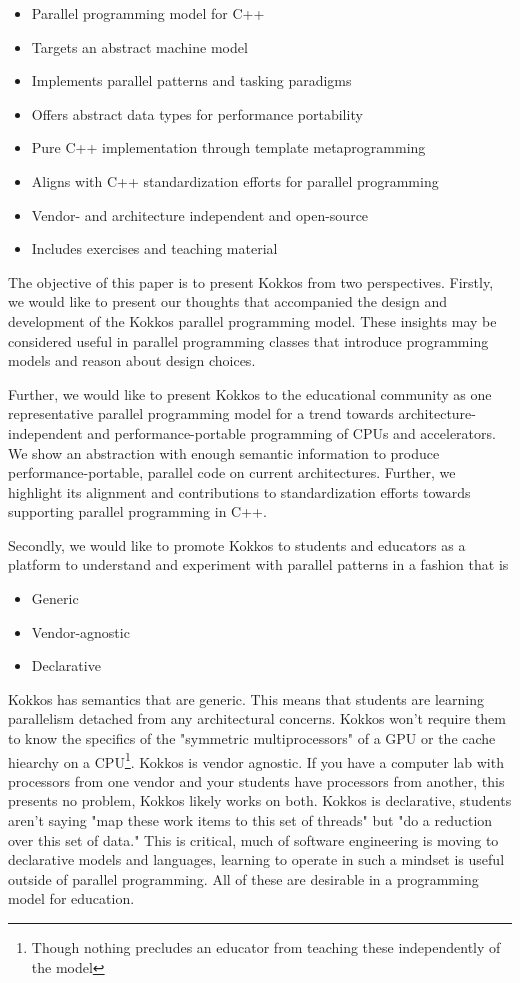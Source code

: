 \begin{itemize}
\item Parallel programming model for C++
\item Targets an abstract machine model
\item Implements parallel patterns and tasking paradigms
\item Offers abstract data types for performance portability
\item Pure C++ implementation through template metaprogramming
\item Aligns with C++ standardization efforts for parallel programming
\item Vendor- and architecture independent and open-source
\item Includes exercises and teaching material
\end{itemize}

The objective of this paper is to present Kokkos from two perspectives. Firstly, we would like to present our thoughts that accompanied the design and development of the Kokkos parallel programming model. These insights may be considered useful in parallel programming classes that introduce programming models and reason about design choices.

Further, we would like to present Kokkos to the educational community as one representative parallel programming model for a trend towards architecture-independent and performance-portable programming of CPUs and accelerators. We show an abstraction with enough semantic information to produce performance-portable, parallel code on current architectures. Further, we highlight its alignment and contributions to standardization efforts towards supporting parallel programming in C++. 

Secondly, we would like to promote Kokkos to students and educators as a platform to understand and experiment with parallel patterns in a fashion that is

\begin{itemize}
\item Generic
\item Vendor-agnostic
\item Declarative
\end{itemize}

Kokkos has semantics that are generic. This means that students are learning parallelism detached from any architectural concerns. Kokkos won't require them to know the specifics of the "symmetric multiprocessors" of a GPU or the cache hiearchy on a CPU\footnote{Though nothing precludes an educator from teaching these independently of the model}. Kokkos is vendor agnostic. If you have a computer lab with processors from one vendor and your students have processors from another, this presents no problem, Kokkos likely works on both. Kokkos is declarative, students aren't saying "map these work items to this set of threads" but "do a reduction over this set of data." This is critical, much of software engineering is moving to declarative models and languages, learning to operate in such a mindset is useful outside of parallel programming. All of these are desirable in a programming model for education.

